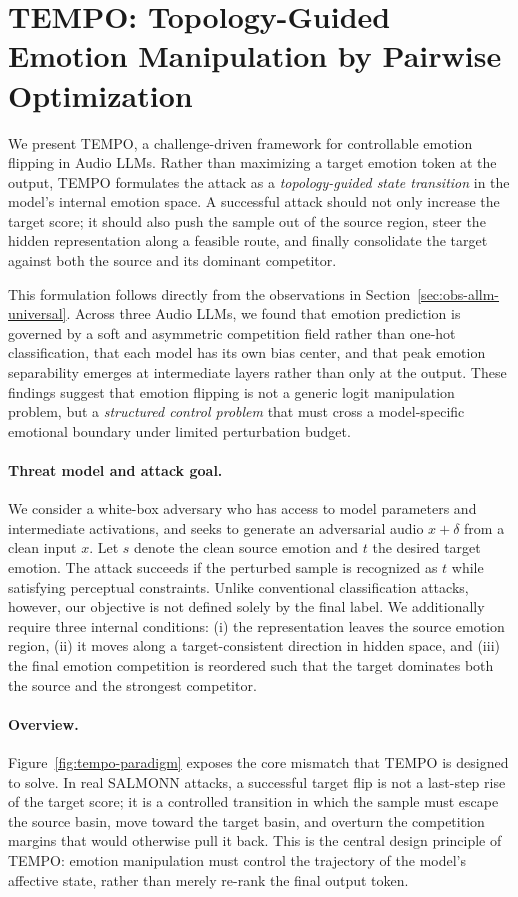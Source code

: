 \section{TEMPO: Topology-Guided Emotion Manipulation by Pairwise Optimization}
\label{sec:method-tempo}
\label{sec:methodology}

We present \textsc{TEMPO}, a challenge-driven framework for controllable emotion flipping in Audio LLMs. Rather than maximizing a target emotion token at the output, \textsc{TEMPO} formulates the attack as a \emph{topology-guided state transition} in the model's internal emotion space. A successful attack should not only increase the target score; it should also push the sample out of the source region, steer the hidden representation along a feasible route, and finally consolidate the target against both the source and its dominant competitor.

This formulation follows directly from the observations in Section~\ref{sec:obs-allm-universal}. Across three Audio LLMs, we found that emotion prediction is governed by a soft and asymmetric competition field rather than one-hot classification, that each model has its own bias center, and that peak emotion separability emerges at intermediate layers rather than only at the output. These findings suggest that emotion flipping is not a generic logit manipulation problem, but a \emph{structured control problem} that must cross a model-specific emotional boundary under limited perturbation budget.

\paragraph{Threat model and attack goal.}
We consider a white-box adversary who has access to model parameters and intermediate activations, and seeks to generate an adversarial audio $x+\delta$ from a clean input $x$. Let $s$ denote the clean source emotion and $t$ the desired target emotion. The attack succeeds if the perturbed sample is recognized as $t$ while satisfying perceptual constraints. Unlike conventional classification attacks, however, our objective is not defined solely by the final label. We additionally require three internal conditions: (i) the representation leaves the source emotion region, (ii) it moves along a target-consistent direction in hidden space, and (iii) the final emotion competition is reordered such that the target dominates both the source and the strongest competitor.

\paragraph{Overview.}
Figure~\ref{fig:tempo-paradigm} exposes the core mismatch that \textsc{TEMPO} is designed to solve. In real SALMONN attacks, a successful target flip is not a last-step rise of the target score; it is a controlled transition in which the sample must escape the source basin, move toward the target basin, and overturn the competition margins that would otherwise pull it back. This is the central design principle of \textsc{TEMPO}: emotion manipulation must control the trajectory of the model's affective state, rather than merely re-rank the final output token.

